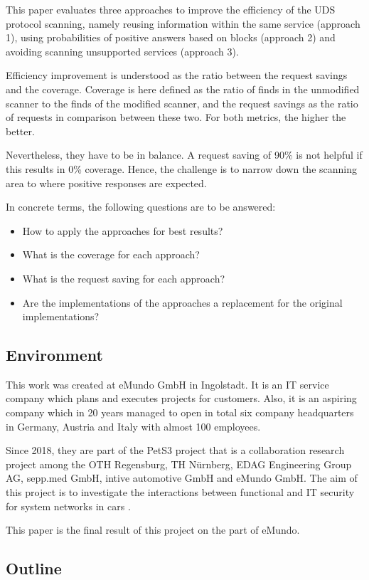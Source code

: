This paper evaluates three approaches to improve the efficiency of the UDS protocol scanning, namely reusing information within the same service (approach 1), using probabilities of positive answers based on blocks (approach 2) and avoiding scanning unsupported services (approach 3).

Efficiency improvement is understood as the ratio between the request savings and the coverage. Coverage is here defined as the ratio of finds in the unmodified scanner to the finds of the modified scanner, and the request savings as the ratio of requests in comparison between these two. For both metrics, the higher the better.

Nevertheless, they have to be in balance. A request saving of 90\% is not helpful if this results in 0\% coverage. Hence, the challenge is to narrow down the scanning area to where positive responses are expected.

In concrete terms, the following questions are to be answered:

\begin{itemize}
    \item How to apply the approaches for best results?
    \item What is the coverage for each approach?
    \item What is the request saving for each approach?
    \item Are the implementations of the approaches a replacement for the original implementations?
\end{itemize}


\subsection{Environment}
This work was created at eMundo GmbH in Ingolstadt. It is an IT service company which plans and executes projects for customers. Also, it is an aspiring company which in 20 years managed to open in total six company headquarters in Germany, Austria and Italy with almost 100 employees.

Since 2018, they are part of the PetS3 project that is a collaboration research project among the OTH Regensburg, TH Nürnberg, EDAG Engineering Group AG, sepp.med GmbH, intive automotive GmbH and eMundo GmbH. The aim of this project is to investigate the interactions between functional and IT security for system networks in cars \cite{pets3}.

This paper is the final result of this project on the part of eMundo.

\subsection{Outline}
